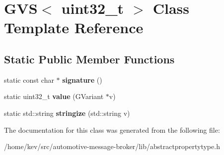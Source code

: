 \hypertarget{classGVS_3_01uint32__t_01_4}{\section{G\-V\-S$<$ uint32\-\_\-t $>$ Class Template Reference}
\label{classGVS_3_01uint32__t_01_4}
}
\subsection*{Static Public Member Functions}
\begin{DoxyCompactItemize}
\item 
\hypertarget{classGVS_3_01uint32__t_01_4_a4ead38a9a6e109e3f8cce37507cdbed5}{static const char $\ast$ {\bfseries signature} ()}\label{classGVS_3_01uint32__t_01_4_a4ead38a9a6e109e3f8cce37507cdbed5}

\item 
\hypertarget{classGVS_3_01uint32__t_01_4_aa71849881fbf20dcca20922bea646007}{static uint32\-\_\-t {\bfseries value} (G\-Variant $\ast$v)}\label{classGVS_3_01uint32__t_01_4_aa71849881fbf20dcca20922bea646007}

\item 
\hypertarget{classGVS_3_01uint32__t_01_4_ac8a872590d86a403b8441b4d0bb03a61}{static std\-::string {\bfseries stringize} (std\-::string v)}\label{classGVS_3_01uint32__t_01_4_ac8a872590d86a403b8441b4d0bb03a61}

\end{DoxyCompactItemize}


The documentation for this class was generated from the following file\-:\begin{DoxyCompactItemize}
\item 
/home/kev/src/automotive-\/message-\/broker/lib/abstractpropertytype.\-h\end{DoxyCompactItemize}
